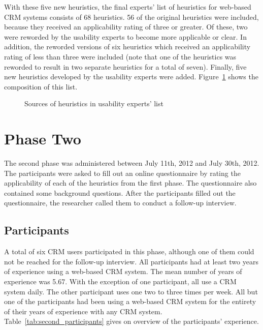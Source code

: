 With these five new heuristics, the final experts' list of heuristics for web-based CRM systems consists of 68 heuristics. 56 of the original heuristics were included, because they received an applicability rating of three or greater. Of these, two were reworded by the usability experts to become more applicable or clear. In addition, the reworded versions of six heuristics which received an applicability rating of less than three were included (note that one of the heuristics was reworded to result in two separate heuristics for a total of seven). Finally, five new heuristics developed by the usability experts were added. Figure~\ref{img:first_final_list} shows the composition of this list.

\begin{figure}[htbp]
	\centering
	
	\caption{Sources of heuristics in usability experts' list}
	\label{img:first_final_list}
\end{figure}

\FloatBarrier
\section{Phase Two}
The second phase was administered between July 11th, 2012 and July 30th, 2012. The participants were asked to fill out an online questionnaire by rating the applicability of each of the heuristics from the first phase. The questionnaire also contained some background questions. After the participants filled out the questionnaire, the researcher called them to conduct a follow-up interview.

\subsection{Participants}
A total of six CRM users participated in this phase, although one of them could not be reached for the follow-up interview. All participants had at least two years of experience using a web-based CRM system. The mean number of years of experience was 5.67. With the exception of one participant, all use a CRM system daily. The other participant uses one two to three times per week. All but one of the participants had been using a web-based CRM system for the entirety of their years of experience with any CRM system. Table~\ref{tab:second_participants} gives on overview of the participants' experience.

